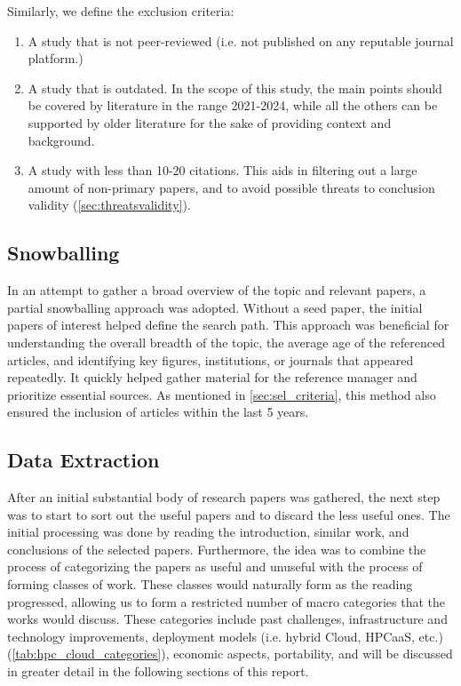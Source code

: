     Similarly, we define the exclusion criteria:

    \begin{enumerate}
        \item[{E}1-] A study that is not peer-reviewed (i.e. not published on any reputable journal platform.)
        \item[{E}2-] A study that is outdated. In the scope of this study, the main points should be covered by literature in the range 2021-2024, while all the others can be supported by older literature for the sake of providing context and background.
        \item[{E}3-] A study with less than 10-20 citations. This aids in filtering out a large amount of non-primary papers, and to avoid possible threats to conclusion validity (\autoref{sec:threatsvalidity}).
    \end{enumerate}



\subsection{Snowballing}
\label{sec:snowballing}

    In an attempt to gather a broad overview of the topic and relevant papers, a partial snowballing approach was adopted. Without a seed paper, the initial papers of interest helped define the search path. This approach was beneficial for understanding the overall breadth of the topic, the average age of the referenced articles, and identifying key figures, institutions, or journals that appeared repeatedly. It quickly helped gather material for the reference manager and prioritize essential sources. As mentioned in \autoref{sec:sel_criteria}, this method also ensured the inclusion of articles within the last 5 years.


\subsection{Data Extraction}
\label{sec:data_extraction}
    After an initial substantial body of research papers was gathered, the next step was to start to sort out the useful papers and to discard the less useful ones. The initial processing was done by reading the introduction, similar work, and conclusions of the selected papers. Furthermore, the idea was to combine the process of categorizing the papers as useful and unuseful with the process of forming classes of work. These classes would naturally form as the reading progressed, allowing us to form a restricted number of macro categories that the works would discuss. These categories include past challenges, infrastructure and technology improvements, deployment models (i.e. hybrid Cloud, HPCaaS, etc.)(\autoref{tab:hpc_cloud_categories}), economic aspects, portability, and will be discussed in greater detail in the following sections of this report.

